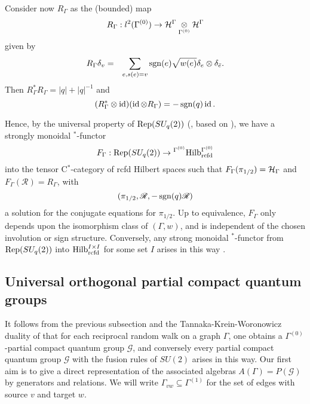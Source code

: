 Consider now $R_{\Gamma}$ as the (bounded) map \[R_{\Gamma}:l^2(\Gamma^{(0)})\rightarrow \mathcal{H}^{\Gamma}\underset{\Gamma^{(0)}}{\otimes} \mathcal{H}^{\Gamma}\] given by \begin{eqnarray*} R_{\Gamma} \delta_v &=& \sum_{e,s(e) = v} \operatorname{\mathrm{sgn}}(e)\sqrt{w(e)}\delta_e \otimes \delta_{\bar{e}}.\end{eqnarray*} Then $R_{\Gamma}^*R_{\Gamma} = |q|+|q|^{-1}$ and \[(R_{\Gamma}^*\otimes \operatorname{id})(\operatorname{id}\otimes R_{\Gamma}) = -\operatorname{\mathrm{sgn}}(q)\operatorname{id}.\]




Hence, by the universal property of $\mathrm{Rep}(SU_q(2))$ (\cite[Theorem 1.4]{DCY1}, based on \cite{Tur1,EtO1,Yam1,Pin2,Pin3}), we have a strongly monoidal $^*$-functor
\begin{equation}\label{EqForget} F_{\Gamma}: \mathrm{Rep}(SU_q(2)) \rightarrow {}^{\Gamma^{(0)}}\mathrm{Hilb}_{\operatorname{\mathrm{rcfd}}}^{\Gamma^{(0)}}\end{equation} into the tensor C$^*$-category of rcfd Hilbert spaces such that $F_{\Gamma}(\pi_{1/2}) = \mathcal{H}_{\Gamma}$ and $F_{\Gamma}(\mathscr{R}) = R_{\Gamma}$, with \[(\pi_{1/2},\mathscr{R},-\operatorname{\mathrm{sgn}}(q)\mathscr{R})\] a solution for the conjugate equations for $\pi_{1/2}$. Up to equivalence, $F_{\Gamma}$ only depends upon the isomorphism class of $(\Gamma,w)$, and is independent of the chosen involution or sign structure. Conversely, any strong monoidal $^*$-functor from $\mathrm{Rep}(SU_q(2))$ into $\mathrm{Hilb}_{\operatorname{\mathrm{rcfd}}}^{I\times I}$ for some set $I$ arises in this way \cite{DCY2}.

\subsection{Universal orthogonal partial compact quantum groups}


It follows from the previous subsection and the Tannaka-Krein-Woronowicz duality of \cite[Theorem 4.14]{DCT1} that for each reciprocal random walk on a graph $\Gamma$, one obtains a $\Gamma^{(0)}$-partial compact quantum group $\mathscr{G}$, and conversely every partial compact quantum group $\mathscr{G}$ with the fusion rules of $SU(2)$ arises in this way. Our first aim is to give a direct representation of the associated algebras $A(\Gamma) = P(\mathscr{G})$ by generators and relations. We will write $\Gamma_{vw}\subseteq \Gamma^{(1)}$ for the set of edges with source $v$ and target $w$.


